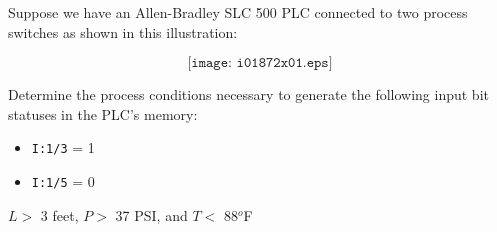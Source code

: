 

Suppose we have an Allen-Bradley SLC 500 PLC connected to two process switches as shown in this illustration:

$$\texttt{[image: i01872x01.eps]}$$

Determine the process conditions necessary to generate the following input bit statuses in the PLC's memory:

\begin{itemize}
\item{} {\tt I:1/3} = 1
\vskip 10pt
\item{} {\tt I:1/5} = 0
\end{itemize}







$L >$ 3 feet, $P >$ 37 PSI, and $T <$ 88$^{o}$F 











